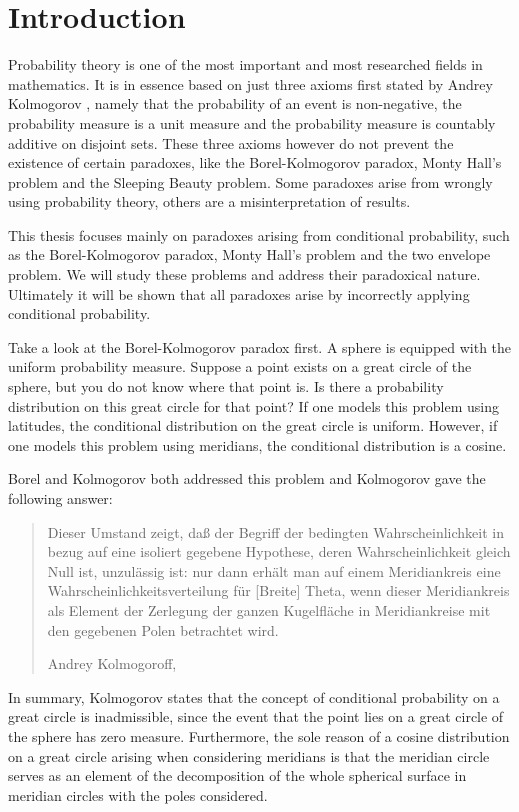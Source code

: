 \documentclass[a4paper]{report}
\theoremstyle{plain}
\theoremstyle{definition}
\theoremstyle{remark}
\numberwithin{equation}{chapter}
\DeclareMathOperator{\1}{\mathbbm{1}}
\begin{document}
\setcounter{page}{2}
\tableofcontents

\chapter{Introduction}
Probability theory is one of the most important and most researched fields in mathematics. It is in essence based on just three axioms first stated by Andrey Kolmogorov \cite{Kolmogorov33}, namely that the probability of an event is non-negative, the probability measure is a unit measure and the probability measure is countably additive on disjoint sets. These three axioms however do not prevent the existence of certain paradoxes, like the Borel-Kolmogorov paradox, Monty Hall's problem and the Sleeping Beauty problem. Some paradoxes arise from wrongly using probability theory, others are a misinterpretation of results.

This thesis focuses mainly on paradoxes arising from conditional probability, such as the Borel-Kolmogorov paradox, Monty Hall's problem and the two envelope problem. We will study these problems and address their paradoxical nature. Ultimately it will be shown that all paradoxes arise by incorrectly applying conditional probability.

Take a look at the Borel-Kolmogorov paradox first. A sphere is equipped with the uniform probability measure. Suppose a point exists on a great circle of the sphere, but you do not know where that point is. Is there a probability distribution on this great circle for that point? If one models this problem using latitudes, the conditional distribution on the great circle is uniform. However, if one models this problem using meridians, the conditional distribution is a cosine.

Borel \cite{Borel09} and Kolmogorov \cite{Kolmogorov33} both addressed this problem and Kolmogorov gave the following answer:
\foreignblockquote{ngerman}[Andrey Kolmogoroff, \cite{Kolmogorov33}]{Dieser Umstand zeigt, daß der Begriff der bedingten Wahrscheinlichkeit in bezug auf eine isoliert gegebene Hypothese, deren Wahrscheinlichkeit gleich Null ist, unzulässig ist: nur dann erhält man auf einem Meridiankreis eine Wahrscheinlichkeitsverteilung für [Breite] Theta, wenn dieser Meridiankreis als Element der Zerlegung der ganzen Kugelfläche in Meridiankreise mit den gegebenen Polen betrachtet wird.}
In summary, Kolmogorov states that the concept of conditional probability on a great circle is inadmissible, since the event that the point lies on a great circle of the sphere has zero measure. Furthermore, the sole reason of a cosine distribution on a great circle arising when considering meridians is that the meridian circle serves as an element of the decomposition of the whole spherical surface in meridian circles with the poles considered.
\end{document}
